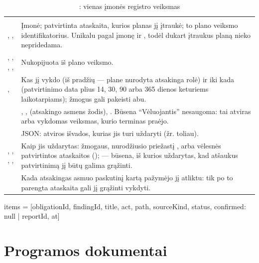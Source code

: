 \begin{xltabular}{\textwidth}{@{}L{38mm}Y@{}}
\caption{: vienas įmonės registro veiksmas}\label{tab:data:ca}\\
\toprule
{} &  \\
\midrule
\endfirsthead
\toprule
{} &  \\
\midrule
\endhead
\bottomrule
\endlastfoot
{}, ,  & Įmonė; patvirtinta ataskaita, kurios planas jį įtraukė; to plano veiksmo identifikatorius. Unikalu pagal įmonę ir , todėl dukart įtraukus planą nieko nepridedama. \\
, , , ,  & Nukopijuota iš plano veiksmo. \\
,  & Kas jį vykdo (iš pradžių --- plane nurodyta atsakinga rolė) ir iki kada (patvirtinimo data plius 14, 30, 90 arba 365 dienos keturiems laikotarpiams); žmogus gali pakeisti abu. \\
 & , ,  (atsakingo asmens žodis), . Būsena \enquote{Vėluojantis} nesaugoma: tai atviras arba vykdomas veiksmas, kurio terminas praėjo. \\
 & JSON: atviros išvados, kurias jis turi uždaryti (žr. toliau). \\
, , , ,  & Kaip jis uždarytas: žmogaus, nurodžiusio priežastį , arba vėlesnės patvirtintos ataskaitos ();  --- būsena, iš kurios uždarytas, kad atšaukus patvirtinimą jį būtų galima grąžinti. \\
 & Kada atsakingas asmuo paskutinį kartą pažymėjo jį atliktu: tik po to parengta ataskaita gali jį grąžinti vykdyti. \\
\end{xltabular}

\begin{codeblock}
items = [{obligationId, findingId, title, act, path, sourceKind, status,
          confirmed: null | {reportId, at}}]
\end{codeblock}

\section{Programos dokumentai}\label{sec:data:programme}

